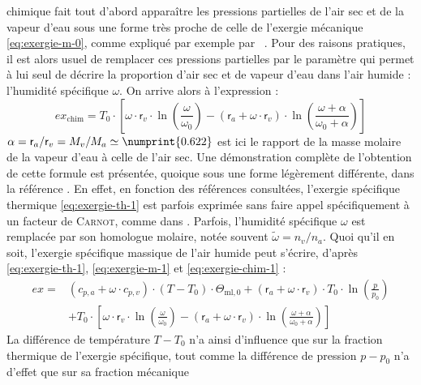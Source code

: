 \documentclass[a4paper,11pt]{scrartcl}
\begin{document}
chimique fait tout d'abord apparaître les pressions partielles de l'air sec et
de la vapeur d'eau sous une forme très proche de celle de l'exergie mécanique
\eqref{eq:exergie-m-0}, comme expliqué par exemple par
\citeauthor{TI-BE8015}~\cite{TI-BE8015}. Pour des raisons pratiques, il est
alors usuel de remplacer ces pressions partielles par le paramètre qui permet à
lui seul de décrire la proportion d'air sec et de vapeur d'eau dans l'air
humide : l'humidité spécifique $\omega$. On arrive alors à l'expression :
\begin{equation}
	ex_{\text{chim}} = T_0 \cdot \left[ \omega \cdot \mathsf{r}_v \cdot
	\ln\left( \frac{\omega}{\omega_0} \right) - (\mathsf{r}_a + \omega \cdot
	\mathsf{r}_v) \cdot \ln\left( \frac{\omega+\alpha}{\omega_0+\alpha}
	\right) \right] \label{eq:exergie-chim-1}
\end{equation} $\alpha = \mathsf{r}_a/\mathsf{r}_v = M_v/M_a \simeq
\numprint{0.622}$ est ici le rapport de la masse molaire de la vapeur d'eau à
celle de l'air sec. Une démonstration complète de l'obtention de cette formule
est présentée, quoique sous une forme légèrement différente, dans la référence
\cite[page 213]{Bejan-2006}. En effet, en fonction des références consultées,
l'exergie spécifique thermique \eqref{eq:exergie-th-1} est parfois exprimée sans
faire appel spécifiquement à un facteur de \textsc{Carnot}, comme dans
\cite{ASHRAE-1979,Bejan-2006}. Parfois, l'humidité spécifique $\omega$ est
remplacée par son homologue molaire, notée souvent $\tilde{\omega} = n_v/n_a$.
Quoi qu'il en soit, l'exergie spécifique massique de l'air humide peut s'écrire,
d'après \eqref{eq:exergie-th-1}, \eqref{eq:exergie-m-1} et
\eqref{eq:exergie-chim-1} : \begin{equation}
	\begin{split}
		ex = & \left( c_{p,a} + \omega \cdot c_{p,v} \right) \cdot
		(T-T_0) \cdot \Theta_{\text{ml},0} + (\mathsf{r}_a + \omega
		\cdot \mathsf{r}_v) \cdot T_0 \cdot \ln\left( \frac{p}{p_0}
		\right) \\
		& + T_0 \cdot \left[ \omega \cdot \mathsf{r}_v \cdot \ln\left(
		\frac{\omega}{\omega_0} \right) - (\mathsf{r}_a + \omega \cdot
		\mathsf{r}_v) \cdot \ln\left(
		\frac{\omega+\alpha}{\omega_0+\alpha} \right) \right]
	\end{split} \label{eq:exergie-specifique}
\end{equation} La différence de température $T-T_0$ n'a ainsi d'influence que
sur la fraction \og thermique \fg de l'exergie spécifique, tout comme la
différence de pression $p-p_0$ n'a d'effet que sur sa fraction \og mécanique
\end{document}
